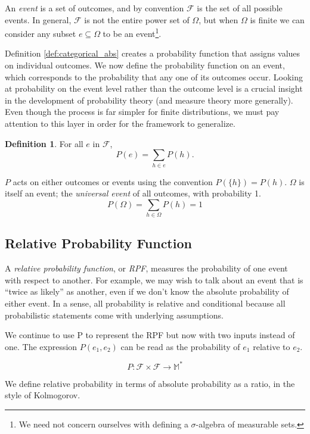 \documentclass[twoside]{article}
\theoremstyle{plain}%
\theoremstyle{definition}
\newtheorem{definition}{Definition}[section]
\theoremstyle{remark}
\begin{document}
An \textit{event} is a set of outcomes, and by convention \(\mathcal{F}\) is the set of all possible events. In general, \(\mathcal{F}\) is not the entire power set of \(\Omega\), but when \(\Omega\) is finite we can consider any subset \(e \subseteq \Omega\) to be an event\footnote{We need not concern ourselves with defining a \(\sigma\)-algebra of measurable sets.}.

Definition \ref{def:categorical_abs} creates a probability function that assigns values on individual outcomes. We now define the probability function on an event, which corresponds to the probability that any one of its outcomes occur. Looking at probability on the event level rather than the outcome level is a crucial insight in the development of probability theory (and measure theory more generally). Even though the process is far simpler for finite distributions, we must pay attention to this layer in order for the framework to generalize. 

\begin{definition}
For all \(e\) in \(\mathcal{F}\), \[P(e) = \sum_{h \in e}{P(h)}.\]
\end{definition}

\(P\) acts on either outcomes or events using the convention \(P(\{h\}) = P(h)\). \(\Omega\) is itself an event; the \textit{universal event} of all outcomes, with probability 1. \[P(\Omega) = \sum_{h \in \Omega}{P(h)} = 1\]

\subsection{Relative Probability Function}
\label{section:standard_relative_prob}

A \textit{relative probability function}, or \textit{RPF}, measures the probability of one event with respect to another. For example, we may wish to talk about an event that is ``twice as likely'' as another, even if we don't know the absolute probability of either event. In a sense, all probability is relative and conditional because all probabilistic statements come with underlying assumptions.

We continue to use P to represent the RPF but now with two inputs instead of one. The expression \(P(e_1, e_2)\) can be read as the probability of \(e_1\) relative to \(e_2\).

\[P: \mathcal{F} \times \mathcal{F} \rightarrow \mathbb{M}^*\]

We define relative probability in terms of absolute probability as a ratio, in the style of Kolmogorov.
\end{document}
